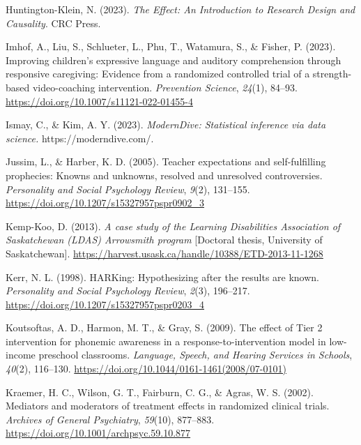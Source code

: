 \documentclass{krantz}
\newlength{\cslhangindent}
\newlength{\cslentryspacingunit} %
\newenvironment{CSLReferences}[2] %
{%
\setlength{\parindent}{0pt}
\ifodd #1
\let\oldpar\par
\def\par{\hangindent=\cslhangindent\oldpar}
\fi
\setlength{\parskip}{#2\cslentryspacingunit}
}%
{}
\begin{document}
\begin{CSLReferences}{1}{0}
\leavevmode{}%
Huntington-Klein, N. (2023). \emph{The {Effect}: An {Introduction} to {Research} {Design} and {Causality}}. {CRC Press}.

\leavevmode{}%
Imhof, A., Liu, S., Schlueter, L., Phu, T., Watamura, S., \& Fisher, P. (2023). Improving children's expressive language and auditory comprehension through responsive caregiving: Evidence from a randomized controlled trial of a strength-based video-coaching intervention. \emph{Prevention Science}, \emph{24}(1), 84--93. \url{https://doi.org/10.1007/s11121-022-01455-4}

\leavevmode{}%
Ismay, C., \& Kim, A. Y. (2023). \emph{{ModernDive}: Statistical inference via data science.} https://moderndive.com/.

\leavevmode{}%
Jussim, L., \& Harber, K. D. (2005). Teacher expectations and self-fulfilling prophecies: Knowns and unknowns, resolved and unresolved controversies. \emph{Personality and Social Psychology Review}, \emph{9}(2), 131--155. \url{https://doi.org/10.1207/s15327957pspr0902_3}

\leavevmode{}%
Kemp-Koo, D. (2013). \emph{A case study of the {Learning Disabilities Association} of {Saskatchewan} ({LDAS}) {Arrowsmith} program} {[}Doctoral thesis, {University of Saskatchewan}{]}. \url{https://harvest.usask.ca/handle/10388/ETD-2013-11-1268}

\leavevmode{}%
Kerr, N. L. (1998). {HARKing}: Hypothesizing after the results are known. \emph{Personality and Social Psychology Review}, \emph{2}(3), 196--217. \url{https://doi.org/10.1207/s15327957pspr0203_4}

\leavevmode{}%
Koutsoftas, A. D., Harmon, M. T., \& Gray, S. (2009). The effect of {Tier} 2 intervention for phonemic awareness in a response-to-intervention model in low-income preschool classrooms. \emph{Language, Speech, and Hearing Services in Schools}, \emph{40}(2), 116--130. \url{https://doi.org/10.1044/0161-1461(2008/07-0101)}

\leavevmode{}%
Kraemer, H. C., Wilson, G. T., Fairburn, C. G., \& Agras, W. S. (2002). Mediators and moderators of treatment effects in randomized clinical trials. \emph{Archives of General Psychiatry}, \emph{59}(10), 877--883. \url{https://doi.org/10.1001/archpsyc.59.10.877}


\end{CSLReferences}
\end{document}
